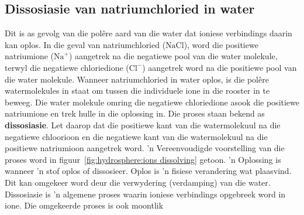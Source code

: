 
\subsection*{Dissosiasie van natriumchloried in water}       
Dit is as gevolg van die pol\^{e}re aard van die water dat ioniese verbindings daarin kan oplos. In die geval van natriumchloried ($\text{NaCl}$), word die positiewe natriumione (${\text{Na}}^{+}$) aangetrek na die negatiewe pool van die water molekule, terwyl die negatiewe chloriedione (${\text{Cl}}^{-}$) aangetrek word na die positiewe pool van die water molekule. Wanneer natriumchloried in water oplos, is die polêre watermolekules in staat om tussen die individuele ione in die rooster in te beweeg. Die water molekule omring die negatiewe chloriedione asook die positiewe natriumione en trek hulle in die oplossing in. Die proses staan bekend as \textbf{dissosiasie}. Let daarop dat die positiewe kant van die watermolekuul na die negatiewe chloorioon en die negatiewe kant van die watermolekuul na die positiewe natriumioon aangetrek word.  'n Vereenvoudigde voorstelling van die proses word in figuur~\ref{fig:hydrosphere:ions dissolving} getoon.  'n Oplossing is wanneer  'n stof oplos of dissosieer. Oplos is 'n fisiese verandering wat plaasvind.  Dit kan omgekeer word deur die verwydering (verdamping) van die water.
\label{m38720*fhsst!!!underscore!!!id155}
 {Dissosiasie is 'n algemene proses waarin ioniese verbindings opgebreek word in ione. Die omgekeerde proses is ook moontlik } 
    \setcounter{subfigure}{0}
